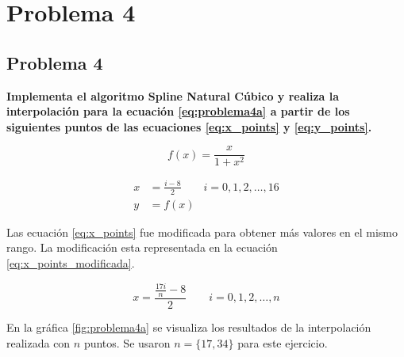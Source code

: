 \section{Problema 4}

\subsection*{Problema 4}

\textbf{Implementa el algoritmo Spline Natural Cúbico y realiza la interpolación para la ecuación \ref{eq:problema4a} a partir de los siguientes puntos de las ecuaciones \ref{eq:x_points} y \ref{eq:y_points}.}

\begin{equation}
	f(x) = \frac{x}{1+x^2} \label{eq:problema4a}
\end{equation}

\begin{align}
	x & = \frac{i-8}{2} \qquad i=0,1,2,\dots,16 \label{eq:x_points} \\
	y & = f(x) \label{eq:y_points}
\end{align}

Las ecuación \ref{eq:x_points} fue modificada para obtener más valores en el mismo rango. La modificación esta representada en la ecuación \ref{eq:x_points_modificada}.

\begin{equation}
	x = \frac{\frac{17i}{n}-8}{2} \qquad i=0,1,2,\dots,n \label{eq:x_points_modificada}
\end{equation}

En la gráfica \ref{fig:problema4a} se visualiza los resultados de la interpolación realizada con $n$ puntos. Se usaron $n=\{17,34\}$ para este ejercicio.


